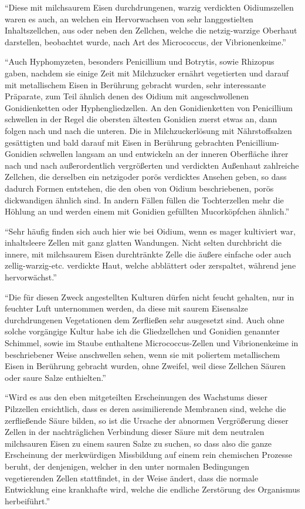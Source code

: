 \documentclass[a4paper, 12pt, oneside]{article}
\begin{document}
"`Diese mit milchsaurem Eisen durchdrungenen, warzig verdickten Oidiumszellen waren es auch, an welchen ein Hervorwachsen von sehr langgestielten Inhaltszellchen, aus oder neben den Zellchen, welche die netzig-warzige Oberhaut darstellen, beobachtet wurde, nach Art des Micrococcus, der Vibrionenkeime."'

"`Auch Hyphomyzeten, besonders Penicillium und Botrytis, sowie Rhizopus gaben, nachdem sie einige Zeit mit Milchzucker ernährt vegetierten und darauf mit metallischem Eisen in Berührung gebracht wurden, sehr interessante Präparate, zum Teil ähnlich denen des Oidium mit angeschwollenen Gonidienketten oder Hyphengliedzellen. An den Gonidienketten von Penicillium schwellen in der Regel die obersten ältesten Gonidien zuerst etwas an, dann folgen nach und nach die unteren. Die in Milchzuckerlösung mit Nährstoffsalzen gesättigten und bald darauf mit Eisen in Berührung gebrachten Penicillium-Gonidien schwellen langsam an und entwickeln an der inneren Oberfläche ihrer nach und nach außerordentlich vergrößerten und verdickten Außenhaut zahlreiche Zellchen, die derselben ein netzigoder porös verdicktes Ansehen geben, so dass dadurch Formen entstehen, die den oben von Oidium beschriebenen, porös dickwandigen ähnlich sind. In andern Fällen füllen die Tochterzellen mehr die Höhlung an und werden einem mit Gonidien gefüllten Mucorköpfchen ähnlich."'

"`Sehr häufig finden sich auch hier wie bei Oidium, wenn es mager kultiviert war, inhaltsleere Zellen mit ganz glatten Wandungen. Nicht selten durchbricht die innere, mit milchsaurem Eisen durchtränkte Zelle die äußere einfache oder auch zellig-warzig-etc. verdickte Haut, welche abblättert oder zerspaltet, während jene hervorwächst."'

"`Die für diesen Zweck angestellten Kulturen dürfen nicht feucht gehalten, nur in feuchter Luft unternommen werden, da diese mit saurem Eisensalze durchdrungenen Vegetationen dem Zerfließen sehr ausgesetzt sind. Auch ohne solche vorgängige Kultur habe ich die Gliedzellchen und Gonidien genannter Schimmel, sowie im Staube enthaltene Micrococcus-Zellen und Vibrionenkeime in beschriebener Weise anschwellen sehen, wenn sie mit poliertem metallischem Eisen in Berührung gebracht wurden, ohne Zweifel, weil diese Zellchen Säuren oder saure Salze enthielten."'

"`Wird es aus den eben mitgeteilten Erscheinungen des Wachstums dieser Pilzzellen ersichtlich, dass es deren assimilierende Membranen sind, welche die zerfließende Säure bilden, so ist die Ursache der abnormen Vergrößerung dieser Zellen in der nachträglichen Verbindung dieser Säure mit dem neutralen milchsauren Eisen zu einem sauren Salze zu suchen, so dass also die ganze Erscheinung der merkwürdigen Missbildung auf einem rein chemischen Prozesse beruht, der denjenigen, welcher in den unter normalen Bedingungen vegetierenden Zellen stattfindet, in der Weise ändert, dass die normale Entwicklung eine krankhafte wird, welche die endliche Zerstörung des Organismus herbeiführt."'
\end{document}
